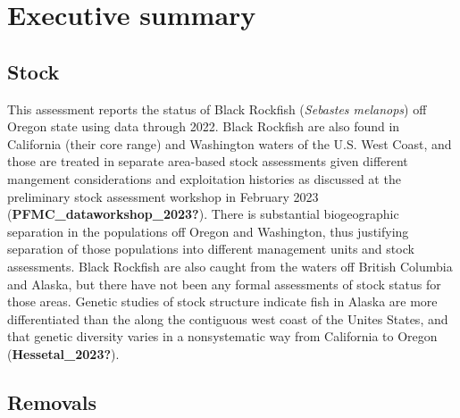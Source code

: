 \documentclass[11pt,
  english,
  letterpaper,
]{article}
\begin{document}
\newcommand{\lt}{\ensuremath <}
\newcommand{\gt}{\ensuremath >}

\vspace{500cm}

\pagebreak
{}
\setcounter{page}{1}

\renewcommand{\thetable}{\roman{table}}
\renewcommand{\thefigure}{\roman{figure}}

\setlength\parskip{0.5em plus 0.1em minus 0.2em}

\hypertarget{executive-summary}{%
\section*{Executive summary}\label{executive-summary}}

\hypertarget{stock}{%
\subsection*{Stock}\label{stock}}

This assessment reports the status of Black Rockfish (\emph{Sebastes melanops}) off Oregon state using data through 2022. Black Rockfish are also found in California (their core range) and Washington waters of the U.S. West Coast, and those are treated in separate area-based stock assessments given different mangement considerations and exploitation histories as discussed at the preliminary stock assessment workshop in February 2023 (\textbf{PFMC\_dataworkshop\_2023?}). There is substantial biogeographic separation in the populations off Oregon and Washington, thus justifying separation of those populations into different management units and stock assessments. Black Rockfish are also caught from the waters off British Columbia and Alaska, but there have not been any formal assessments of stock status for those areas. Genetic studies of stock structure indicate fish in Alaska are more differentiated than the along the contiguous west coast of the Unites States, and that genetic diversity varies in a nonsystematic way from California to Oregon (\textbf{Hessetal\_2023?}).

\hypertarget{removals}{%
\subsection*{Removals}\label{removals}}
\end{document}
